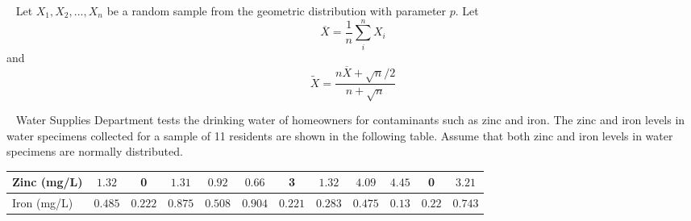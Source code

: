 \documentclass[letterpaper,10pt,addpoints]{exam}
\begin{document}
\begin{questions}

\question[20]~
Let $X_1,X_2,...,X_n$ be a random sample from the geometric distribution with parameter $p$. Let $$\overline{X} = \frac{1}{n}\sum_i^n X_i$$ and $$\tilde{X} = \frac{n\overline{X}+\sqrt{n}/2}{n+\sqrt{n}}$$


\question[30]~
Water Supplies Department tests the drinking water of homeowners for contaminants such as zinc and iron. The zinc and iron levels in water specimens collected for a sample of 11 residents are shown in the following table. Assume that both zinc and iron levels in water specimens are normally distributed.

\begin{tabular}{|l|c|c|c|c|c|c|c|c|c|c|c|}
\hline Zinc (mg/L) & $1.32$ & 0 & $1.31$ & $0.92$ & $0.66$ & 3 & $1.32$ & $4.09$ & $4.45$ & 0 & $3.21$ \\
\hline Iron (mg/L) & $0.485$ & $0.222$ & $0.875$ & $0.508$ & $0.904$ & $0.221$ & $0.283$ & $0.475$ & $0.13$ & $0.22$ & $0.743$ \\
\hline
\end{tabular}
\end{questions}
\end{document}
